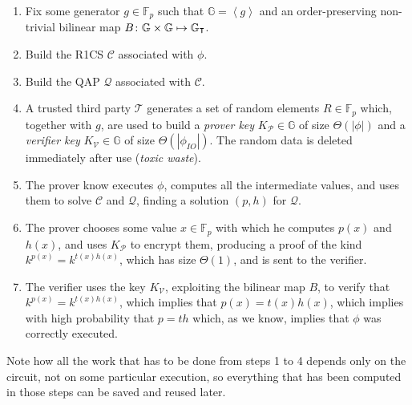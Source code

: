 \begin{enumerate}
	\item Fix some generator \(g \in \mathbb{F}_p\) such that
	      \(\mathbb{G} = \left\langle{g}\right\rangle \) and an order-preserving non-trivial bilinear
	      map \(B\colon \mathbb{G} \times \mathbb{G} \mapsto \mathbb{G}_{\transpose}\).
	\item Build the R1CS \(\mathcal{C}\) associated with \(\phi \).
	\item Build the QAP \(\mathcal{Q}\) associated with \(\mathcal{C}\).
	\item A trusted third party \(\mathcal{T}\) generates a set of random elements
	      \(R \in \mathbb{F}_p\) which, together with \(g\), are used to build a \emph{prover key}
	      \(K_{\mathcal{P}} \in \mathbb{G}\) of size \(\Theta\left(\left|\phi\right|\right)\) and a
	      \emph{verifier key} \(K_{\mathcal{V}} \in \mathbb{G}\) of size
	      \(\Theta\left(\left|\phi_{IO}\right|\right)\).
	      The random data is deleted immediately after use (\emph{toxic waste}).
	\item The prover know executes \(\phi \), computes all the intermediate values, and uses them to
	      solve \(\mathcal{C}\) and \(\mathcal{Q}\), finding a solution \(\left(p, h\right)\) for
	      \(\mathcal{Q}\).
	\item The prover chooses some value \(x \in \mathbb{F}_p\) with which he computes
	      \(p\left(x\right)\) and \(h\left(x\right)\), and uses \(K_{\mathcal{P}}\) to encrypt them,
	      producing a proof of the kind \(k^{p(x)} =
	      k^{t\left(x\right)h\left(x\right)}\), which has size \(\Theta\left(1\right)\), and is sent
	      to the verifier.
	\item The verifier uses the key \(K_{\mathcal{V}}\), exploiting the bilinear map \(B\), to
	      verify that \(k^{p\left(x\right)} = k^{t\left(x\right)h\left(x\right)}\), which implies
	      that \(p\left(x\right) = t\left(x\right)h\left(x\right)\), which implies with
	      high probability that \(p = th\) which, as we know, implies that \(\phi \) was correctly
	      executed.
\end{enumerate}

\noindent Note how all the work that has to be done from steps 1 to 4 depends only on the
circuit, not on some particular execution, so everything that has been computed in those steps
can be saved and reused later.
